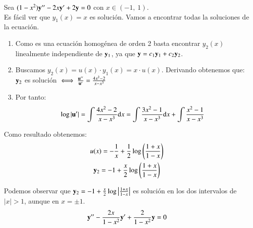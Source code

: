 \begin{eg}
    Sea $(1-x^2)\mathbf{y}'' - 2x\mathbf{y}' + 2\mathbf{y} = 0$ con $x\in(-1,\ 1)$.\\%
    Es fácil ver que $y_1(x) = x$ es solución. Vamos a encontrar todas la soluciones de la ecuación.
    \begin{enumerate}
        \item Como es una ecuación homogénea de orden 2 basta encontrar $y_2(x)$ linealmente independiente de $\mathbf{y}_1$, ya que $\mathbf{y} = c_1 \mathbf{y}_1 + c_2 \mathbf{y}_2$.
        \item Buscamos $y_2(x) = u(x)\cdot y_1(x) = x \cdot u(x)$. Derivando obtenemos que:\\
        $\mathbf{y}_2$ es solución $\iff \frac{\mathbf{u}''}{\mathbf{u}'} = \frac{4x^2-2}{x-x^3}$
        \item Por tanto:$$
            \log |\mathbf{u}'| = \int \frac{4x^2-2}{x-x^3} \mathrm{d} x = \int \frac{3x^2-1}{x-x^3} \mathrm{d} x + \int \frac{x^2-1}{x-x^3}
            $$
    \end{enumerate}
    Como resultado obtenemos:
    \begin{gather*}
        u(x) = -\frac{1}{x} + \frac{1}{2}\log\left(\frac{1+x}{1-x}\right)\\
        \mathbf{y}_2 = -1 + \frac{x}{2}\log\left(\frac{1+x}{1-x}\right)
    \end{gather*}

    Podemos observar que $\mathbf{y}_2 = -1 + \frac{x}{2}\log\left|\frac{1+x}{1-x}\right|$ es solución en los dos intervalos de $|x| > 1$, aunque  en $x = \pm 1$.
    $$
        \mathbf{y}'' - \frac{2x}{1-x^2}\mathbf{y}' + \frac{2}{1-x^2}\mathbf{y} = 0
    $$
\end{eg}
